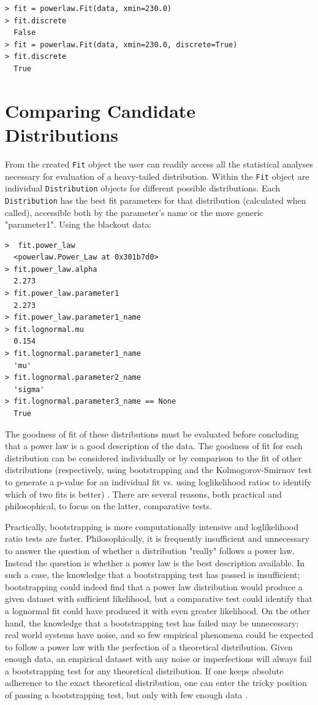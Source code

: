 \documentclass[10pt]{article}
\begin{document}
\begin{verbatim}
> fit = powerlaw.Fit(data, xmin=230.0)
> fit.discrete
  False
> fit = powerlaw.Fit(data, xmin=230.0, discrete=True)
> fit.discrete 
  True
\end{verbatim}


\section*{Comparing Candidate Distributions}
From the created \verb"Fit" object the user can readily access all the statistical analyses necessary for evaluation of a heavy-tailed distribution. Within the \verb"Fit" object are individual \verb"Distribution" objects for different possible distributions. Each \verb"Distribution" has the best fit parameters for that distribution (calculated when called), accessible both by the parameter's name or the more generic "parameter1". Using the blackout data:

\begin{verbatim}
>  fit.power_law
  <powerlaw.Power_Law at 0x301b7d0>
> fit.power_law.alpha
  2.273
> fit.power_law.parameter1
  2.273 
> fit.power_law.parameter1_name
> fit.lognormal.mu
  0.154
> fit.lognormal.parameter1_name
  'mu'
> fit.lognormal.parameter2_name
  'sigma'
> fit.lognormal.parameter3_name == None
  True
\end{verbatim}

The goodness of fit of these distributions must be evaluated before concluding that a power law is a good description of the data. The goodness of fit for each distribution can be considered individually or by comparison to the fit of other distributions (respectively, using bootstrapping and the Kolmogorov-Smirnov test to generate a p-value for an individual fit vs. using loglikelihood ratios to identify which of two fits is better) \cite{Clauset2009}. There are several reasons, both practical and philosophical, to focus on the latter, comparative tests. 

Practically, bootstrapping is more computationally intensive and loglikelihood ratio tests are faster. Philosophically, it is frequently insufficient and unnecessary to answer the question of whether a distribution "really" follows a power law. Instead the question is whether a power law is the best description available. In such a case, the knowledge that a bootstrapping test has passed is insufficient; bootstrapping could indeed find that a power law distribution would produce a given dataset with sufficient likelihood, but a comparative test could identify that a lognormal fit could have produced it with even greater likelihood. On the other hand, the knowledge that a bootstrapping test has failed may be unnecessary; real world systems have noise, and so few empirical phenomena could be expected to follow a power law with the perfection of a theoretical distribution. Given enough data, an empirical dataset with any noise or imperfections will always fail a bootstrapping test for any theoretical distribution. If one keeps absolute adherence to the exact theoretical distribution, one can enter the tricky position of passing a bootstrapping test, but only with few enough data \cite{Klaus2011}. 
\end{document}
